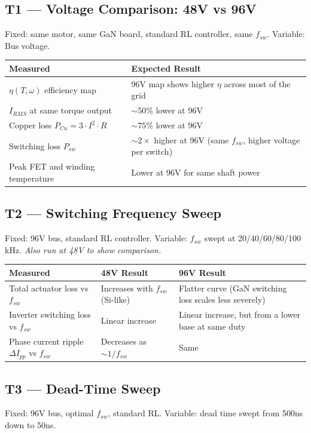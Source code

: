 \documentclass[11pt]{article}
\begin{document}
\subsection*{T1 — Voltage Comparison: 48V vs 96V}
Fixed: same motor, same GaN board, standard RL controller, same $f_{sw}$. Variable: Bus voltage.

\vspace{0.2cm}
\noindent
\begin{tabularx}{\textwidth}{@{}l X@{}}
\toprule
\textbf{Measured} & \textbf{Expected Result} \\
\midrule
$\eta(T, \omega)$ efficiency map & 96V map shows higher $\eta$ across most of the grid \\
$I_{RMS}$ at same torque output & $\sim 50\%$ lower at 96V \\
Copper loss $P_{Cu} = 3 \cdot I^2 \cdot R$ & $\sim 75\%$ lower at 96V \\
Switching loss $P_{sw}$ & $\sim 2\times$ higher at 96V (same $f_{sw}$, higher voltage per switch) \\
Peak FET and winding temperature & Lower at 96V for same shaft power \\
\bottomrule
\end{tabularx}

\subsection*{T2 — Switching Frequency Sweep}
Fixed: 96V bus, standard RL controller. Variable: $f_{sw}$ swept at 20/40/60/80/100 kHz. \textit{Also run at 48V to show comparison.}

\vspace{0.2cm}
\noindent
\begin{tabularx}{\textwidth}{@{}l X X@{}}
\toprule
\textbf{Measured} & \textbf{48V Result} & \textbf{96V Result} \\
\midrule
Total actuator loss vs $f_{sw}$ & Increases with $f_{sw}$ (Si-like) & Flatter curve (GaN switching loss scales less severely) \\
Inverter switching loss vs $f_{sw}$ & Linear increase & Linear increase, but from a lower base at same duty \\
Phase current ripple $\Delta I_{pp}$ vs $f_{sw}$ & Decreases as $\sim 1/f_{sw}$ & Same \\
\bottomrule
\end{tabularx}

\subsection*{T3 — Dead-Time Sweep}
Fixed: 96V bus, optimal $f_{sw}$, standard RL. Variable: dead time swept from 500ns down to 50ns.
\end{document}
